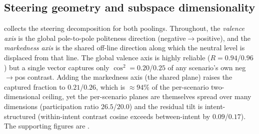\documentclass{article}
\begin{document}
\clearpage
\subsection{Steering geometry and subspace dimensionality}\label{app:res-steering}

 collects the steering decomposition for both poolings.
Throughout, the \emph{valence axis} is the global pole-to-pole politeness
direction (negative$\to$positive), and the \emph{markedness axis} is the shared
off-line direction along which the neutral level is displaced from that line. The
global valence axis is highly reliable ($R=0.94$/$0.96$) but a single vector
captures only $\cos^2=0.20$/$0.25$ of any scenario's own neg$\to$pos contrast.
Adding the markedness axis (the shared plane) raises the captured fraction to
$0.21$/$0.26$, which is $\approx94\%$ of the per-scenario two-dimensional ceiling,
yet the per-scenario planes are themselves spread over many dimensions
(participation ratio $26.5$/$20.0$) and the residual tilt is intent-structured
(within-intent contrast cosine exceeds between-intent by $0.09$/$0.17$). The
supporting figures are .
\end{document}
